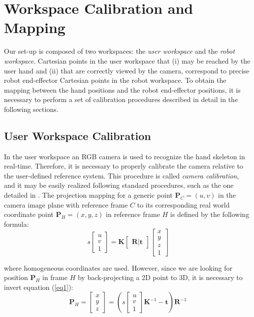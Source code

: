 \documentclass[a4paper, 10 pt, conference]{ieeeconf}      %
\begin{document}
\section{Workspace Calibration and Mapping} \label{sec:calib}

Our set-up is composed of two workspaces: the \textit{user workspace} and the \textit{robot workspace}. Cartesian points in the user workspace that (i) may be reached by the user hand and (ii) that are correctly viewed by the camera, correspond to precise robot end-effector Cartesian points in the robot workspace. To obtain the mapping between the hand positions and the robot end-effector positions, it is necessary to perform a set of calibration procedures described in detail in the following sections.

\subsection{User Workspace Calibration}
In the user workspace an RGB camera is used to recognize the hand skeleton in real-time. Therefore, it is necessary to properly calibrate the camera relative to the user-defined reference system. This procedure is called \textit{camera calibration}, and it may be easily realized following standard procedures, such as the one detailed in \cite{CameraCalib}.
The projection mapping for a generic point $\mathbf{P}_{C} = (u,v)$ in the camera image plane with reference frame $C$ to its corresponding real world coordinate point $\mathbf{P}_{H} = (x,y,z)$ in reference frame $H$ is defined by the following formula:
\begin{equation}
s 
\begin{bmatrix}
u \\
v \\
1
\end{bmatrix}
=
\mathbf{K}
\begin{bmatrix}
\mathbf{R} | \mathbf{t}
\end{bmatrix}
\begin{bmatrix}
x \\
y \\
z \\
1
\end{bmatrix}
\label{eq1}
\end{equation}

where homogeneous coordinates are used. However, since we are looking for position $\mathbf{P}_H$ in frame $H$ by back-projecting a 2D point to 3D, it is necessary to invert equation (\ref{eq1}):
\begin{equation}
\mathbf{P}_{H} = \begin{bmatrix}
x \\
y \\
z
\end{bmatrix}=
\left(s 
\begin{bmatrix}
u \\
v \\
1
\end{bmatrix}
\mathbf{K}^{-1}-\mathbf{t}\right)\mathbf{R}^{-1}
\label{eq2}
\end{equation}
\end{document}

